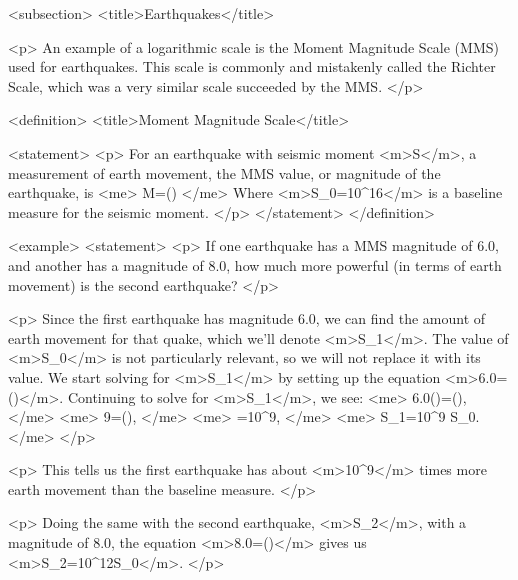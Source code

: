     <subsection>
        <title>Earthquakes</title>

        <p>
            An example of a logarithmic scale is the Moment Magnitude Scale (MMS) used for earthquakes.
            This scale is commonly and mistakenly called the Richter Scale, which was a very similar scale succeeded by the MMS.
        </p>

        <definition>
            <title>Moment Magnitude Scale</title>

            <statement>
                <p>
                    For an earthquake with seismic moment <m>S</m>, a measurement of earth movement, the MMS value, or magnitude of the earthquake, is
                    <me>
                        M=\log()
                    </me>
                    Where <m>S_{0}=10^{1}6</m> is a baseline measure for the seismic moment.
                </p>
            </statement>
        </definition>

        <example>
            <statement>
                <p>
                    If one earthquake has a MMS magnitude of 6.0, and another has a magnitude of 8.0, how much more powerful (in terms of earth movement) is the second earthquake?
                </p>

                <p>
                    Since the first earthquake has magnitude 6.0, we can find the amount of earth movement for that quake, which we’ll denote <m>S_{1}</m>.
                    The value of <m>S_{0}</m> is not particularly relevant, so we will not replace it with its value.
                    We start solving for <m>S_{1}</m> by setting up the equation <m>6.0=\log()</m>.
                    Continuing to solve for <m>S_{1}</m>, we see:
                    <me>
                        6.0()=\log(),
                    </me>
                    <me>
                        9=\log(),
                    </me>
                    <me>
                        =10^{9},
                    </me>
                    <me>
                        S_{1}=10^{9} S_{0}.
                    </me>
                </p>

                <p>
                    This tells us the first earthquake has about <m>10^{9}</m> times more earth movement than the baseline measure.
                </p>

                <p>
                    Doing the same with the second earthquake, <m>S_{2}</m>, with a magnitude of 8.0, the equation <m>8.0=\log()</m> gives us <m>S_{2}=10^{12}S_{0}</m>.
                </p>

